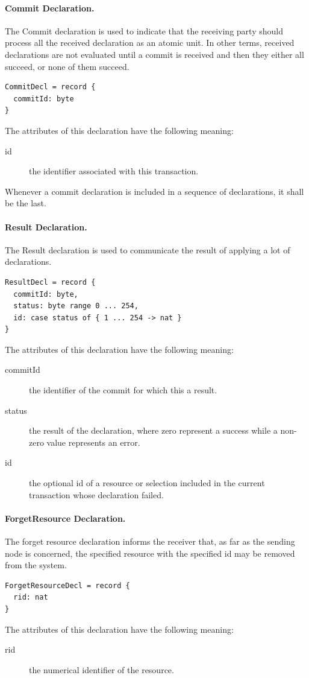 \documentclass[a4paper,oneside,article]{memoir}
\begin{document}
\paragraph{Commit Declaration.} The Commit declaration is used to indicate that the receiving party
should process all the received declaration as an atomic unit.  In other terms, received
declarations are not evaluated until a commit is received and then they either all succeed, or none
of them succeed.
\begin{verbatim}
CommitDecl = record {
  commitId: byte
}  
\end{verbatim}

The attributes of this declaration have the following meaning:
\begin{description}
\item[id] the identifier associated with this transaction.
\end{description}
Whenever a commit declaration is included in a sequence of declarations, it shall be the last.

\paragraph{Result Declaration.} The Result declaration is used to communicate the result of
applying a lot of declarations.
\begin{verbatim}
ResultDecl = record {
  commitId: byte,
  status: byte range 0 ... 254,
  id: case status of { 1 ... 254 -> nat }
}
\end{verbatim}

The attributes of this declaration have the following meaning:
\begin{description}
\item[commitId] the identifier of the commit for which this a result.
\item[status] the result of the declaration, where zero represent a success while a non-zero value
  represents an error.
\item[id] the optional id of a resource or selection included in the current transaction whose
  declaration failed.
\end{description}

\paragraph{ForgetResource Declaration.} The forget resource declaration informs the receiver that,
as far as the sending node is concerned, the specified resource with the specified id may be removed
from the system.
\begin{verbatim}
ForgetResourceDecl = record {
  rid: nat
}
\end{verbatim}
The attributes of this declaration have the following meaning:
\begin{description}
\item[rid] the numerical identifier of the resource.
\end{description}
\end{document}
